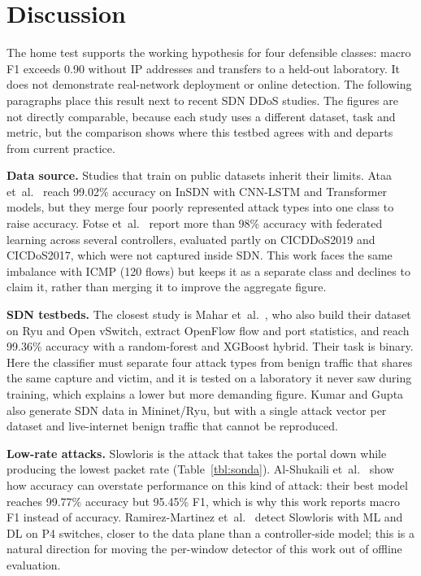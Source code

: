 \documentclass[ASNA,twocolumn]{USG}
\begin{document}
\section{Discussion}\label{sec:discussion}
  The home test supports the working hypothesis for four defensible classes: macro F1 exceeds 0.90 without IP addresses and transfers to a held-out laboratory. It does not demonstrate real-network deployment or online detection. The following paragraphs place this result next to recent SDN DDoS studies. The figures are not directly comparable, because each study uses a different dataset, task and metric, but the comparison shows where this testbed agrees with and departs from current practice.

  \textbf{Data source.} Studies that train on public datasets inherit their limits. Ataa et~al.\ \citep{ataa2024insdn} reach 99.02\% accuracy on InSDN with CNN-LSTM and Transformer models, but they merge four poorly represented attack types into one class to raise accuracy. Fotse et~al.\ \citep{fotse2025fedlad} report more than 98\% accuracy with federated learning across several controllers, evaluated partly on CICDDoS2019 and CICDoS2017, which were not captured inside SDN. This work faces the same imbalance with ICMP (120 flows) but keeps it as a separate class and declines to claim it, rather than merging it to improve the aggregate figure.

  \textbf{SDN testbeds.} The closest study is Mahar et~al.\ \citep{mahar2026hybrid}, who also build their dataset on Ryu and Open vSwitch, extract OpenFlow flow and port statistics, and reach 99.36\% accuracy with a random-forest and XGBoost hybrid. Their task is binary. Here the classifier must separate four attack types from benign traffic that shares the same capture and victim, and it is tested on a laboratory it never saw during training, which explains a lower but more demanding figure. Kumar and Gupta \citep{kumar2025synflood,kumar2026icmpfloodsdn} also generate SDN data in Mininet/Ryu, but with a single attack vector per dataset and live-internet benign traffic that cannot be reproduced.

  \textbf{Low-rate attacks.} Slowloris is the attack that takes the portal down while producing the lowest packet rate (Table~\ref{tbl:sonda}). Al-Shukaili et~al.\ \citep{alshukaili2025lddos} show how accuracy can overstate performance on this kind of attack: their best model reaches 99.77\% accuracy but 95.45\% F1, which is why this work reports macro F1 instead of accuracy. Ramirez-Martinez et~al.\ \citep{ramirez2025p4slowloris} detect Slowloris with ML and DL on P4 switches, closer to the data plane than a controller-side model; this is a natural direction for moving the per-window detector of this work out of offline evaluation.
\end{document}
